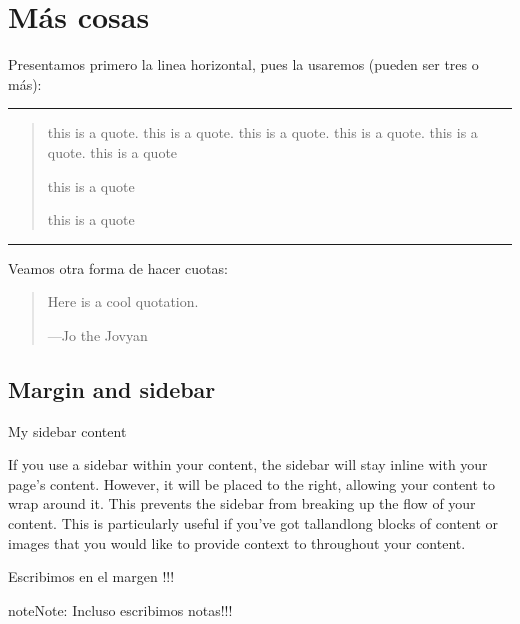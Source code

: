 \documentclass[letterpaper,10pt,english]{jupyterBook}
\begin{document}
\section{Más cosas}
\label{\detokenize{docs/02_04_Mas_cosas:mas-cosas}}\label{\detokenize{docs/02_04_Mas_cosas::doc}}
\sphinxAtStartPar
Presentamos primero la linea horizontal, pues la usaremos (pueden ser tres \sphinxcode{\sphinxupquote{\sphinxhyphen{}}} o más):


\bigskip\hrule\bigskip

\begin{quote}

\sphinxAtStartPar
this is a quote. this is a quote. this is a quote. this is a quote. this is a quote. this is a quote

\sphinxAtStartPar
this is a quote

\sphinxAtStartPar
this is a quote
\end{quote}


\bigskip\hrule\bigskip


\sphinxAtStartPar
Veamos otra forma de hacer cuotas:
\begin{quote}

\sphinxAtStartPar
Here is a cool quotation.

\begin{flushright}
---Jo the Jovyan
\end{flushright}
\end{quote}


\subsection{Margin and sidebar}
\label{\detokenize{docs/02_04_Mas_cosas:margin-and-sidebar}}
\begin{sphinxShadowBox}

\sphinxAtStartPar
My sidebar content
\end{sphinxShadowBox}

\sphinxAtStartPar
If you use a sidebar within your content, the sidebar will stay in\sphinxhyphen{}line with your page’s content. However, it will be placed to the right, allowing your content to wrap around it. This prevents the sidebar from breaking up the flow of your content. This is particularly useful if you’ve got tall\sphinxhyphen{}and\sphinxhyphen{}long blocks of content or images that you would like to provide context to throughout your content.

\begin{sphinxShadowBox}
\sphinxstylesidebartitle{}

\sphinxAtStartPar
Escribimos en el margen !!!

\begin{sphinxadmonition}{note}{Note:}
\sphinxAtStartPar
Incluso escribimos notas!!!
\end{sphinxadmonition}
\end{sphinxShadowBox}
\end{document}
